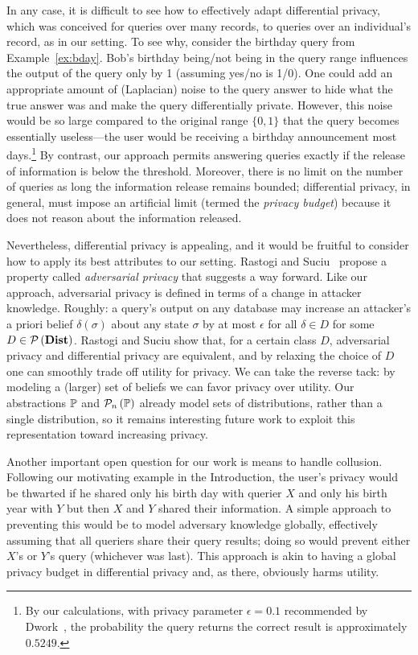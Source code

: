 In any case, it is difficult to see how
to effectively adapt differential privacy, which was conceived for
queries over many records, to queries over an individual's record,
as in our setting.  To see why,
consider the birthday query from Example~\ref{ex:bday}.  Bob's
birthday being/not being in the query range influences the output of
the query only by 1 (assuming yes/no is 1/0). One could add an
appropriate amount of (Laplacian) noise to the query answer to hide
what the true answer was and make the query differentially
private. However, this noise would be so large compared to
the original range $\{0,1\}$ that the query becomes essentially
useless---the user would be receiving a birthday announcement most
days.\footnote{By our calculations, with privacy parameter $\epsilon =
  0.1$ recommended by 
Dwork~\cite{diffpriv}, the probability the query returns the correct
result is approximately $0.5249$.}   By contrast, our approach permits answering
queries exactly if the release of information is below the threshold.  Moreover,
there is no limit on the number of queries as long the information
release remains bounded; differential privacy, in general, must impose
an artificial limit (termed the \emph{privacy budget}) because it does
not reason about the information released.

Nevertheless, differential privacy is appealing, and it would be
fruitful to consider how to apply its best attributes to our setting.
Rastogi and Suciu~\cite{rastogi09relationship} propose a property
called \emph{adversarial privacy} that suggests a way forward.  Like
our approach, adversarial privacy is defined in terms of a change in
attacker knowledge. Roughly: a query's output on any database may
increase an attacker's a priori belief $\delta(\sigma)$ about any
state $\sigma$ by at most $\epsilon$ for all $\delta \in D$ for some
$D \in \mathcal{P}\left( \textbf{Dist} \right)$.  Rastogi and Suciu show that, for a certain
class $D$, adversarial privacy and differential privacy are
equivalent, and by relaxing the choice of $D$ one can smoothly trade
off utility for privacy.  We can take the
reverse tack: by modeling a (larger) set of beliefs we can favor
privacy over utility.  Our abstractions $\mathbb{P}$ and $\mathcal{P}_{n}\left( \mathbb{P} \right)$
already model sets of distributions, rather than a single
distribution, so it remains interesting future work to exploit this
representation toward increasing privacy. 
\fi

\ifacita
Another important open question for our work is means to handle
collusion.  Following our motivating example in the Introduction, the
user's privacy would be thwarted if he shared only his birth day with
querier $X$ and only his birth year with $Y$ but then $X$ and $Y$
shared their information.  A simple approach to preventing this would
be to model adversary knowledge globally, effectively assuming that
all queriers share their query results; doing so would prevent either
$X$'s or $Y$'s query (whichever was last).  This approach is akin to
having a global privacy budget in differential privacy and, as there,
obviously harms utility.


